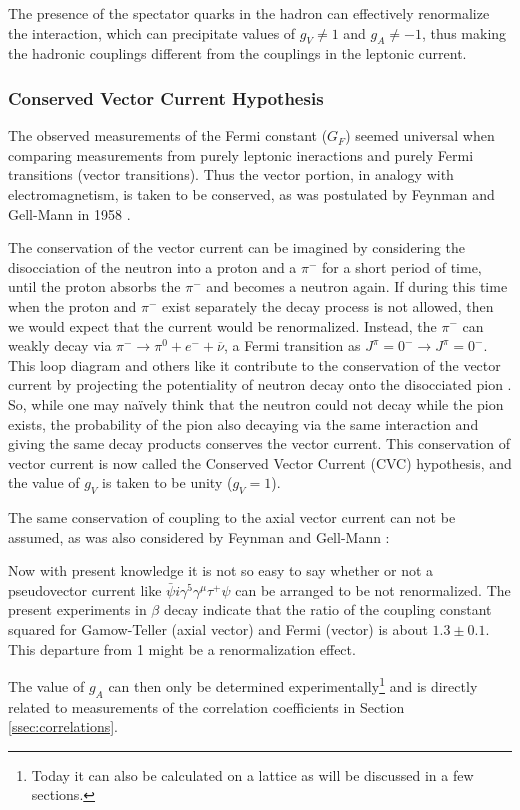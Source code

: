 The presence of the spectator quarks in the hadron
can effectively renormalize the interaction, which can
precipitate values of $g_V\neq 1$ and $g_A\neq -1$,
thus making the hadronic couplings different from the
couplings in the leptonic current.

\subsubsection{Conserved Vector Current Hypothesis}

The observed measurements of the Fermi constant ($G_F$) seemed
universal when comparing measurements from
purely leptonic ineractions and purely Fermi transitions (vector transitions).
Thus the vector portion, in analogy with
electromagnetism, is taken to be conserved, as was postulated by Feynman and Gell-Mann in
1958 \cite{feynman1958}. 

The conservation of the vector current can be imagined by considering the disocciation of the neutron
into a proton and a $\pi^{-}$ for a short period of time, until the proton absorbs the
$\pi^{-}$ and becomes a neutron again. If during this time when the proton and $\pi^{-}$ exist separately
the decay process is not allowed, then we would expect that the current would be renormalized.
Instead, the $\pi^{-}$ can weakly decay via $\pi^- \rightarrow \pi^0+e^- + \overline{\nu}$,
a Fermi transition as $J^\pi=0^- \rightarrow J^\pi=0^-$. This loop diagram and others like it contribute to the
conservation of the vector current by projecting
the potentiality of neutron decay onto the disocciated pion \cite{grotz1990}. So, while one may na\"{i}vely
think that the neutron could not decay while the pion exists, the probability of the pion also decaying
via the same interaction and giving the same decay products conserves the vector current.
This conservation of vector current is now called the
Conserved Vector Current (CVC) hypothesis, and the value of $g_V$ is taken to be unity ($g_V = 1$).

The same conservation of coupling to the axial vector current can not be assumed, as was also 
considered by Feynman and Gell-Mann \cite{feynman1958}:
%
\begin{displayquote}
Now with present knowledge it is not so easy to say
whether or not a pseudovector current like
$\bar{\psi}i\gamma^5\gamma^\mu\tau^+\psi$
can be arranged to be not renormalized. The present
experiments in $\beta$ decay indicate that the ratio of the
coupling constant squared for Gamow-Teller (axial vector) and Fermi
(vector)
is about $1.3\pm0.1$. This departure from 1 might be a
renormalization effect.
\end{displayquote}
%
The value of $g_A$ can then only be determined experimentally\footnote{Today it can also be calculated on
  a lattice as will be discussed in a few sections.} and is directly related to measurements
of the correlation coefficients in Section \ref{ssec:correlations}.


